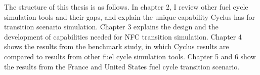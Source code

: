 The structure of this thesis is as follows. In chapter 2, I review other fuel cycle simulation
tools and their gaps, and explain the unique capability Cyclus
has for transition scenario simulation.
Chapter 3 explains the design and
the development of capabilities needed for \gls{NFC} transition simulation.
Chapter 4 shows the results from the benchmark study, in which Cyclus results are compared
to results from other fuel cycle simulation tools.
Chapter 5 and 6 show the results from the France and United States fuel cycle
transition scenario.
